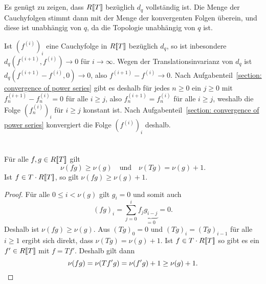 \documentclass[a4paper, 10pt, numbers=noenddot]{scrartcl}
\begin{document}





\section{}

Es genügt zu zeigen, dass $R[\![T]\!]$ bezüglich $d_q$ vollständig ist.
Die Menge der Cauchyfolgen stimmt dann mit der Menge der konvergenten Folgen überein, und diese ist unabhängig von $q$, da die Topologie unabhängig von $q$ ist.

Ist $(f^{(i)})_i$ eine Cauchyfolge in $R[\![T]\!]$ bezüglich $d_q$, so ist inbesondere $d_q(f^{(i+1)}, f^{(i)}) \to 0$ für $i \to \infty$.
Wegen der Translationsinvarianz von $d_q$ ist $d_q(f^{(i+1)} - f^{(i)}, 0) \to 0$, also $f^{(i+1)} - f^{(i)} \to 0$.
Nach Aufgabenteil~\ref{section: convergence of power series} gibt es deshalb für jedes $n \geq 0$ ein $j \geq 0$ mit $f^{(i+1)}_n - f^{(i)}_n = 0$ für alle $i \geq j$, also $f^{(i+1)}_n = f^{(i)}_n$ für alle $i \geq j$, weshalb die Folge $(f^{(i)}_n)_i$ für $i \geq j$ konstant ist.
Nach Aufgabenteil~\ref{section: convergence of power series} konvergiert die Folge $(f^{(i)})_i$ deshalb.





\section{}

\begin{claim}
  Für alle $f, g \in R[\![T]\!]$ gilt
  \[
    \nu(f g) \geq \nu(g)
    \quad\text{und}\quad
    \nu(T g) = \nu(g) + 1.
  \]
  Ist $f \in T \cdot R[\![T]\!]$, so gilt $\nu(f g) \geq \nu(g) + 1$.
\end{claim}
\begin{proof}
  Für alle $0 \leq i < \nu(g)$ gilt $g_i = 0$ und somit auch
  \[
      (f g)_i
    = \sum_{j=0}^i f_j \underbrace{g_{i-j}}_{=0}
    = 0.
  \]
  Deshalb ist $\nu(f g) \geq \nu(g)$.  
  Aus $(T g)_0 = 0$ und $(T g)_i = (T g)_{i-1}$ für alle $i \geq 1$ ergibt sich direkt, dass $\nu(T g) = \nu(g) + 1$.
  Ist $f \in T \cdot R[\![T]\!]$ so gibt es ein $f' \in R[\![T]\!]$ mit $f = T f'$.
  Deshalb gilt dann
  \[
          \nu(f g)
    =     \nu(T f' g)
    =     \nu(f' g) + 1
    \geq  \nu(g) + 1.
    \qedhere
  \]
\end{proof}
\end{document}

